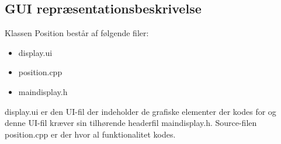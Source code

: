 \subsection{GUI repræsentationsbeskrivelse}

Klassen Position består af følgende filer:
\begin{itemize}
\item display.ui
\item position.cpp
\item maindisplay.h
\end{itemize}

display.ui er den UI-fil der indeholder de grafiske elementer der kodes for og denne UI-fil kræver sin tilhørende headerfil maindisplay.h. Source-filen position.cpp er der hvor al funktionalitet kodes.
\newline

